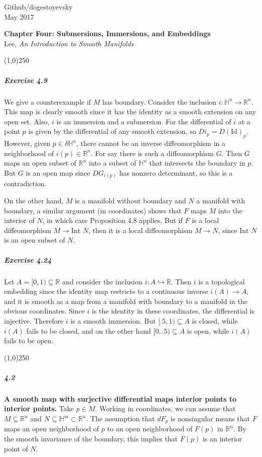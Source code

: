 \documentclass[10pt,letter]{article}
\begin{document}
\noindent Github/dogestoyevsky \\
May 2017
\begin{center}
\textbf{Chapter Four: Submersions, Immersions, and Embeddings}\\ Lee, \textit{An Introduction to Smooth Manifolds}

\line(1,0){250}
\end{center}

\subparagraph{Exercise 4.9} We give a counterexample if $M$ has boundary. Consider the inclusion $i: \mathbb{H}^n \rightarrow \mathbb{R}^n$. This map is clearly smooth since it has the identity as a smooth extension on any open set. Also, $i$ is an immersion and a submersion. For the differential of $i$ at a point $p$ is given by the differential of any smooth extension, so $Di_p = D(\text{Id})_p$. However, given $p \in \delta \mathbb{H}^n$, there cannot be an inverse diffeomorphism in a neighborhood of $i(p) \in \mathbb{R}^n$. For say there is such a diffeomorphism $G$. Then $G$ maps an open subset of $\mathbb{R}^n$ into a subset of $\mathbb{H}^n$ that intersects the boundary in $p$. But $G$ is an open map since $DG_{i(p)}$ has nonzero determinant, so this is a contradiction. 

On the other hand, $M$ is a manifold without boundary and $N$ a manifold with boundary, a similar argument (in coordinates) shows that $F$ maps $M$ into the interior of $N$, in which case Proposition 4.8 applies. But if $F$ is a local diffeomorphism $M \rightarrow \text{Int }N$, then it is a local diffeomorphism $M \rightarrow N$, since $\text{Int }N$ is an open subset of $N$. 

\subparagraph{Exercise 4.24} Let $A = [0,1) \subseteq \mathbb{R}$ and consider the inclusion $i: A \hookrightarrow \mathbb{R}$. Then $i$ is a topological embedding since the identity map restricts to a continuous inverse $i(A) \rightarrow A$, and it is smooth as a map from a manifold with boundary to a manifold in the obvious coordinates. Since $i$ is the identity in these coordinates, the differential is injective. Therefore $i$ is a smooth immersion. But $[.5,1) \subseteq A$ is closed, while $i(A)$ fails to be closed, and on the other hand $[0,.5) \subseteq A$ is open, while $i(A)$ fails to be open. 

\begin{center}
\line(1,0){250}
\end{center}


\subparagraph{4.2} {\bf A smooth map with surjective differential maps interior points to interior points.} Take $p \in M$. Working in coordinates, we can assume that $M \subseteq \mathbb{R}^n$ and $N \subseteq \mathbb{H}^m \subset \mathbb{R}^n$. The assumption that $dF_p$ is nonsingular means that $F$ maps an open neighborhood of $p$ to an open neighborhood of $F(p)$ in $\mathbb{R}^n$. By the smooth invariance of the boundary, this implies that $F(p)$ is an interior point of $N$.
\end{document}
